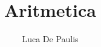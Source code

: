 \documentclass[italian,oneside,headinclude,10pt]{scrbook}
\begin{document}
\author{Luca De Paulis}
\title{Aritmetica}
\maketitle

\tableofcontents

% 







\end{document}
